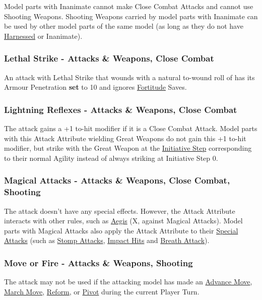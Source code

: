 Model parts with Inanimate cannot make Close Combat Attacks and cannot use Shooting Weapons. Shooting Weapons carried by model parts with Inanimate can be used by other model parts of the same model (as long as they do not  have \hyperref[harnessed]{Harnessed} or Inanimate).

\subsubsection{Lethal Strike - Attacks \&{} Weapons, Close Combat}
\label{lethal_strike}

An attack with Lethal Strike that wounds with a natural to-wound roll of  has its Armour Penetration \textbf{set} to 10 and ignores \hyperref[fortitude]{Fortitude} Saves.

\subsubsection{Lightning Reflexes - Attacks \&{} Weapons, Close Combat}
\label{lightning_reflexes}

The attack gains a +1 to-hit modifier if it is a Close Combat Attack. Model parts with this Attack Attribute wielding Great Weapons do not gain this +1 to-hit modifier, but strike with the Great Weapon at the \hyperref[initiative_order]{Initiative Step} corresponding to their normal Agility instead of always striking at Initiative Step 0.

\subsubsection{Magical Attacks - Attacks \&{} Weapons, Close Combat, Shooting}
\label{magical_attacks}

The attack doesn't have any special effects. However, the Attack Attribute interacts with other rules, such as \hyperref[aegis]{Aegis} (X, against Magical Attacks). Model parts with Magical Attacks also apply the Attack Attribute to their \hyperref[special_attacks]{Special Attacks} (such as \hyperref[stomp_attacks]{Stomp Attacks}, \hyperref[impact_hits]{Impact Hits} and \hyperref[breath_attack]{Breath Attack}).

\subsubsection{Move or Fire - Attacks \&{} Weapons, Shooting}
\label{move_or_fire}

The attack may not be used if the attacking model has made an \hyperref[advance_move]{Advance Move}, \hyperref[march_move]{March Move}, \hyperref[reform]{Reform}, or \hyperref[pivots_and_wheels]{Pivot} during the current Player Turn.

